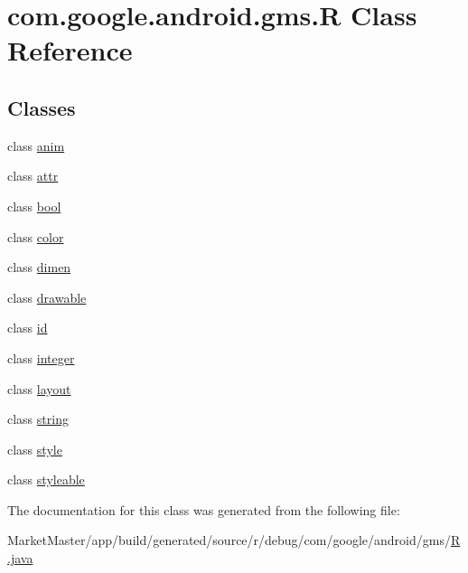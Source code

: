 \hypertarget{classcom_1_1google_1_1android_1_1gms_1_1R}{}\section{com.\+google.\+android.\+gms.\+R Class Reference}
\label{classcom_1_1google_1_1android_1_1gms_1_1R}
\subsection*{Classes}
\begin{DoxyCompactItemize}
\item 
class \mbox{\hyperlink{classcom_1_1google_1_1android_1_1gms_1_1R_1_1anim}{anim}}
\item 
class \mbox{\hyperlink{classcom_1_1google_1_1android_1_1gms_1_1R_1_1attr}{attr}}
\item 
class \mbox{\hyperlink{classcom_1_1google_1_1android_1_1gms_1_1R_1_1bool}{bool}}
\item 
class \mbox{\hyperlink{classcom_1_1google_1_1android_1_1gms_1_1R_1_1color}{color}}
\item 
class \mbox{\hyperlink{classcom_1_1google_1_1android_1_1gms_1_1R_1_1dimen}{dimen}}
\item 
class \mbox{\hyperlink{classcom_1_1google_1_1android_1_1gms_1_1R_1_1drawable}{drawable}}
\item 
class \mbox{\hyperlink{classcom_1_1google_1_1android_1_1gms_1_1R_1_1id}{id}}
\item 
class \mbox{\hyperlink{classcom_1_1google_1_1android_1_1gms_1_1R_1_1integer}{integer}}
\item 
class \mbox{\hyperlink{classcom_1_1google_1_1android_1_1gms_1_1R_1_1layout}{layout}}
\item 
class \mbox{\hyperlink{classcom_1_1google_1_1android_1_1gms_1_1R_1_1string}{string}}
\item 
class \mbox{\hyperlink{classcom_1_1google_1_1android_1_1gms_1_1R_1_1style}{style}}
\item 
class \mbox{\hyperlink{classcom_1_1google_1_1android_1_1gms_1_1R_1_1styleable}{styleable}}
\end{DoxyCompactItemize}


The documentation for this class was generated from the following file\+:\begin{DoxyCompactItemize}
\item 
Market\+Master/app/build/generated/source/r/debug/com/google/android/gms/\mbox{\hyperlink{debug_2com_2google_2android_2gms_2R_8java}{R.\+java}}\end{DoxyCompactItemize}
